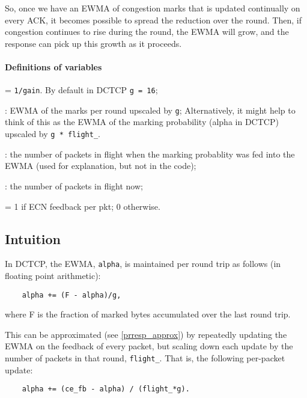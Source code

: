 So, once we have an EWMA of congestion marks that is updated continually on
every ACK, it becomes possible to spread the reduction over the round. Then,  if
congestion continues to rise during the round, the EWMA will grow, and the
response can pick up this growth as it proceeds.

\paragraph{Definitions of variables}
\begin{description}[nosep]
	\item [\texttt{g}] = \texttt{1/gain}. By default in DCTCP \texttt{g = 16};
	\item [\texttt{av\_up}]: EWMA of the marks per round upscaled by \texttt{g};
	Alternatively, it might help to think of this as the EWMA of the marking
	probability (alpha in DCTCP) upscaled by \texttt{g * flight\_}. 
	\item [\texttt{flight\_}]: the number of packets in flight when the marking
	probablity was fed into the EWMA (used for explanation, but not in the code);
	\item [\texttt{flight}]: the number of packets in flight now;
	\item [\texttt{ce\_fb}] = 1 if ECN feedback per pkt; 0 otherwise.
\end{description}

\subsection{Intuition}\label{prresp_intuition}

In DCTCP, the EWMA, \texttt{alpha}, is maintained per round trip as follows (in
floating point arithmetic):
\begin{verbatim}
    alpha += (F - alpha)/g,
\end{verbatim}
where F is the fraction of marked bytes accumulated over the last round trip.

This can be approximated (see \autoref{prresp_approx}) by repeatedly updating
the EWMA on the feedback of every packet, but scaling down each update by the
number of packets in that round, \texttt{flight\_}. That is, the following
per-packet update:
\begin{verbatim}
    alpha += (ce_fb - alpha) / (flight_*g).
\end{verbatim}

